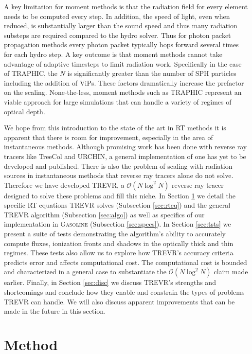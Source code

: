 \documentclass[fleq,usenatbib]{mnras}
\newcommand{\acro}{TREVR}
\newcommand{\bigO}[1]{\mathcal{O}\left(#1\right)}
\begin{document}
A key limitation for moment methods is that the radiation field for every 
element needs to be computed every step. In addition, the speed of light, even 
when reduced, is substantially larger than the sound speed and thus many 
radiation substeps are required compared to the hydro solver. Thus for photon 
packet propagation methods every photon packet typically hops forward several 
times for each hydro step. A key outcome is that moment methods cannot take
advantage of adaptive timesteps to limit radiation work. Specifically in the 
case of TRAPHIC, the $N$ is significantly greater than the number of SPH 
particles including the addition of ViPs. These factors dramatically increase 
the prefactor on the scaling.  None-the-less, moment methods such as TRAPHIC 
represent an viable approach for large simulations that can handle a variety 
of regimes of optical depth.

We hope from this introduction to the state of the art in RT methods it is 
apparent that there is room for improvement, especially in the area of 
instantaneous methods. Although promising work has been done with reverse ray 
tracers like TreeCol and URCHIN, a general implementation of one has yet to be 
developed and published. There is also the problem of scaling with radiation 
sources in instantaneous methods that reverse ray tracers alone do not solve. 
Therefore we have developed \acro{}, a $\bigO{N \log^2 N}$ reverse ray tracer 
designed to solve these problems and fill this niche. In Section 
\ref{sec:mthd} we detail the specific RT equations \acro{} solves 
(Subsection \ref{sec:rteq}) and the general \acro{} algorithm (Subsection 
\ref{sec:algo}) as well as specifics of our implementation in 
\textsc{Gasoline} (Subsection \ref{sec:specs}). In Section \ref{sec:tsts} we 
present a suite of tests demonstrating the algorithm's ability to accurately 
compute fluxes, ionization fronts and shadows in the optically thick and thin 
regimes. These tests also allow us to explore how \acro{}'s accuracy criteria 
predicts error and affects computational cost. The computational cost is 
bounded and characterized in a general case to substantiate the 
$\bigO{N \log^2 N}$ claim made earlier. Finally, in Section \ref{sec:disc} we 
discuss \acro{}'s strengths and shortcomings and conclude how they enable and 
constrain the types of problems \acro{} can handle. We will also discuss 
apparent improvements that can be made in the future in this section.

\section{Method}\label{sec:mthd}
\end{document}
